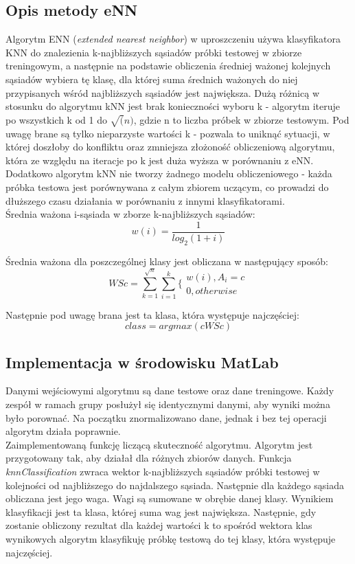 \documentclass[[10pt,a4paper]{article}
\begin{document}
\subsection{Opis metody eNN~\cite{enn} ~\cite{enn2} }

Algorytm ENN (\emph{extended nearest neighbor}) w uproszczeniu używa klasyfikatora KNN do znalezienia k-najbliższych sąsiadów próbki testowej w zbiorze treningowym, a następnie na podstawie obliczenia średniej ważonej kolejnych sąsiadów wybiera tę klasę, dla której suma średnich ważonych do niej przypisanych wśród najbliższych sąsiadów jest największa. Dużą różnicą w stosunku do algorytmu kNN jest brak konieczności wyboru k - algorytm iteruje po wszystkich k od 1 do \(\sqrt(n)\), gdzie n to liczba próbek w zbiorze testowym. Pod uwagę brane są tylko nieparzyste wartości k - pozwala to uniknąć sytuacji, w której doszłoby do konfliktu oraz zmniejsza złożoność obliczeniową algorytmu, która ze względu na iteracje po k jest duża wyższa w porównaniu z eNN. Dodatkowo algorytm kNN nie tworzy żadnego modelu obliczeniowego - każda próbka testowa jest porównywana z całym zbiorem uczącym, co prowadzi do dłuższego czasu działania w porównaniu z innymi klasyfikatorami. \\

Średnia ważona i-sąsiada w zborze k-najbliższych sąsiadów:
\[w(i) = \frac{1}{log_2(1+i)}\]

Średnia ważona dla poszczególnej klasy jest obliczana w następujący sposób:
\[WSc = \sum_{k=1}^{\sqrt{n}} \sum^{k}_{i=1} \left. \{\begin{array} {l} w(i), A_{i} = c \\ 0, otherwise  \end{array} \right .\]

Następnie pod uwagę brana jest ta klasa, która występuje najczęściej:
\[ class = argmax(c WSc)\]

\subsection{Implementacja w środowisku MatLab}
Danymi wejściowymi algorytmu są dane testowe oraz dane treningowe. Każdy zespół w ramach grupy posłużył się identycznymi danymi, aby wyniki można było porownać. Na początku znormalizowano dane, jednak i bez tej operacji algorytm działa poprawnie.\\

Zaimplementowaną funkcję liczącą skuteczność algorytmu. Algorytm jest przygotowany tak, aby działał dla różnych zbiorów danych. Funkcja \emph{knnClassification} zwraca wektor k-najbliższych sąsiadów próbki testowej w kolejności od najbliższego do najdalszego sąsiada. Następnie dla każdego sąsiada obliczana jest jego waga. Wagi są sumowane w obrębie danej klasy. Wynikiem klasyfikacji jest ta klasa, której suma wag jest największa. Następnie, gdy zostanie obliczony rezultat dla każdej wartości k to spośród wektora klas wynikowych algorytm klasyfikuję próbkę testową do tej klasy, która występuje najczęściej.
\end{document}
